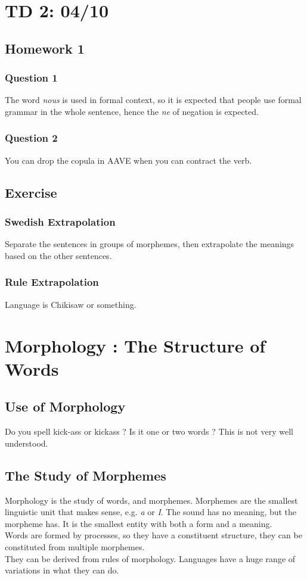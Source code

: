 \documentclass{cours}
\begin{document}
\section{TD 2\!: 04/10}
\subsection{Homework 1}
\subsubsection{Question 1}
The word \textsl{nous} is used in formal context, so it is expected that people use formal grammar in the whole sentence, hence the \textsl{ne} of negation is expected. 

\subsubsection{Question 2}
You can drop the copula in AAVE when you can contract the verb. 

\subsection{Exercise}
\subsubsection{Swedish Extrapolation}
Separate the sentences in groups of morphemes, then extrapolate the meanings based on the other sentences.

\subsubsection{Rule Extrapolation}
Language is Chikisaw or something.

\section[Cours 3\!: 05/10]{Morphology\! : The Structure of Words}
\subsection{Use of Morphology}
Do you spell kick-ass or kickass ? Is it one or two words ? This is not very well understood.

\subsection{The Study of Morphemes}
Morphology is the study of words, and morphemes. Morphemes are the smallest linguistic unit that makes sense, e.g. \textsl{a} or \textsl{I}. 
The sound has no meaning, but the morpheme has. It is the smallest entity with both a form and a meaning.\\
Words are formed by processes, so they have a constituent structure, they can be constituted from multiple morphemes.\\
They can be derived from rules of morphology. Languages have a huge range of variations in what they can do.\\
\end{document}

